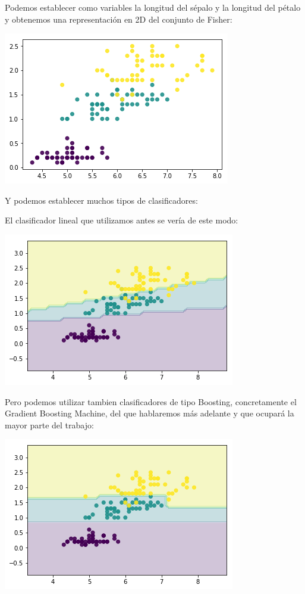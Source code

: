 \pagebreak
Podemos establecer como variables la longitud del sépalo y la longitud del pétalo y obtenemos una representación en 2D del conjunto de Fisher:

\begin{center}
\includegraphics[scale=0.7]{./img/fisher_data.png}
\end{center}

Y podemos establecer muchos tipos de clasificadores:

El clasificador lineal que utilizamos antes se vería de este modo:

\begin{center}
\includegraphics[scale=0.7]{./img/fisher_lin.png}
\end{center}

Pero podemos utilizar tambien clasificadores de tipo Boosting, concretamente el Gradient Boosting Machine, del que hablaremos más adelante y que ocupará la mayor parte del trabajo:

\begin{center}
\includegraphics[scale=0.7]{./img/fisher_gbm.png}
\end{center}




